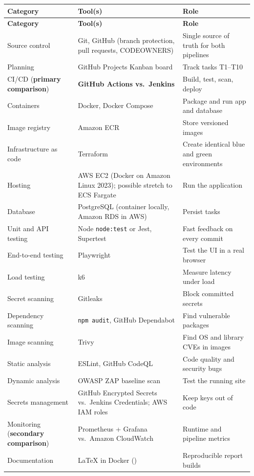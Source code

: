 \begin{tabularx}{\linewidth}{L{2.8cm}YL{3.0cm}}
\caption{Planned DevSecOps Tool Chain\label{Table:ProposalTools}}\\
\toprule \textbf{Category} & \textbf{Tool(s)} & \textbf{Role}\\ \midrule
\endfirsthead
\toprule \textbf{Category} & \textbf{Tool(s)} & \textbf{Role}\\ \midrule
\endhead \bottomrule \endlastfoot
Source control & Git, GitHub (branch protection, pull requests, CODEOWNERS) & Single source of truth for both pipelines\\
Planning & GitHub Projects Kanban board & Track tasks T1--T10\\
CI/CD (\textbf{primary comparison}) & \textbf{GitHub Actions vs.\ Jenkins} & Build, test, scan, deploy\\
Containers & Docker, Docker Compose & Package and run app and database\\
Image registry & Amazon ECR & Store versioned images\\
Infrastructure as code & Terraform & Create identical blue and green environments\\
Hosting & AWS EC2 (Docker on Amazon Linux 2023); possible stretch to ECS Fargate & Run the application\\
Database & PostgreSQL (container locally, Amazon RDS in AWS) & Persist tasks\\
Unit and API testing & Node \texttt{node:test} or Jest, Supertest & Fast feedback on every commit\\
End-to-end testing & Playwright & Test the UI in a real browser\\
Load testing & k6 & Measure latency under load\\
Secret scanning & Gitleaks & Block committed secrets\\
Dependency scanning & \texttt{npm audit}, GitHub Dependabot & Find vulnerable packages\\
Image scanning & Trivy & Find OS and library CVEs in images\\
Static analysis & ESLint, GitHub CodeQL & Code quality and security bugs\\
Dynamic analysis & OWASP ZAP baseline scan & Test the running site\\
Secrets management & GitHub Encrypted Secrets vs.\ Jenkins Credentials; AWS IAM roles & Keep keys out of code\\
Monitoring (\textbf{secondary comparison}) & Prometheus + Grafana vs.\ Amazon CloudWatch & Runtime and pipeline metrics\\
Documentation & LaTeX in Docker () & Reproducible report builds\\
\end{tabularx}

